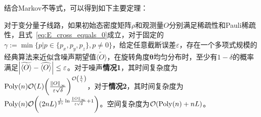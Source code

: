 结合Markov不等式，可以得到如下主要定理：
\begin{theorem}\label{thm:main}
    对于变分量子线路，如果初始态密度矩阵$\rho$和观测量$O$分别满足稀疏性和Pauli稀疏性，且式~\eqref{eq:E_cross_equals_0}成立，对于固定的$\gamma:=\min\{p|{p \in \{p_x,p_y,p_z\},p\neq 0}\}$，给定任意截断误差$\varepsilon$，存在一个多项式规模的经典算法来近似含噪声期望值$\widetilde{\langle O\rangle}$，在旋转角度$\bm{\theta}$均匀分布时，至少有$1-\delta$的概率满足$\abs{\widetilde{\langle O\rangle}-\widehat{\langle O\rangle}} \leq \varepsilon$。对于噪声\textbf{情况1}，其时间复杂度为$\mathrm{Poly}(n) \order{L} \bigg(\frac{\norm{O}_\infty}{\varepsilon \sqrt{\delta}} \bigg)^{\order{\frac{1}{\gamma}}}$，对于\textbf{情况2}，其时间复杂度为$\mathrm{Poly}(n)  \order{(2nL)^{\frac{1}{2\gamma} \ln{\frac{\norm{O}_\infty}{\varepsilon \sqrt{\delta}}}+1}}$。空间复杂度为$\order{\mathrm{Poly}(n)+nL}$。
\end{theorem}
